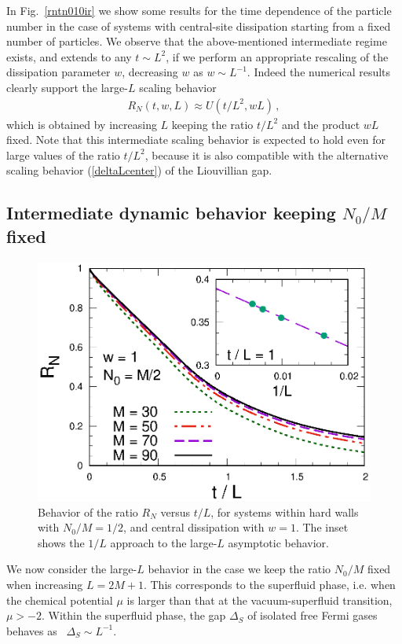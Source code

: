   
  In Fig.~\ref{rntn010ir} we show some results for the time dependence
  of the particle number in the case of systems with central-site
  dissipation starting from a fixed number of particles. We observe that
  the above-mentioned intermediate regime exists, and extends to any
  $t\sim L^2$, if we perform an appropriate rescaling of the dissipation
  parameter $w$, decreasing $w$ as $w\sim L^{-1}$. Indeed the numerical
  results clearly support the large-$L$ scaling behavior
  \begin{eqnarray}
   R_N(t,w,L) \approx U(t/L^2,wL)\,,   \label{scalbehwl}
  \end{eqnarray}
  which is obtained by increasing $L$ keeping the ratio $t/L^2$ and the
  product $wL$ fixed.  Note that this intermediate scaling behavior is
  expected to hold even for large values of the ratio $t/L^2$, because
  it is also compatible with the alternative scaling behavior
  (\ref{deltaLcenter}) of the Liouvillian gap.
  
  
  
  
  
  
  \subsection{Intermediate dynamic behavior keeping $N_0/M$ fixed}
  \label{N0oLfixed}
  
  \begin{figure}[!htb]
\centering
    \includegraphics[width=0.65\columnwidth]{imm/NLL1.eps}
    \caption{Behavior of the ratio $R_N$ versus $t/L$, for systems
      within hard walls with $N_0/M=1/2$, and central dissipation with
      $w=1$. The inset shows the $1/L$ approach to the large-$L$
      asymptotic behavior.}
    \label{rntn0lvstol}
  \end{figure}
  
  We now consider the large-$L$ behavior in the case we keep the ratio
  $N_0/M$ fixed when increasing $L=2M+1$. This corresponds to the
  superfluid phase, i.e. when the chemical potential $\mu$ is larger
  than that at the vacuum-superfluid transition, $\mu>-2$. Within the
  superfluid phase, the gap $\Delta_S$ of isolated free Fermi gases
  behaves as~\cite{Sachdev-book} $\Delta_S \sim L^{-1}$.
  
